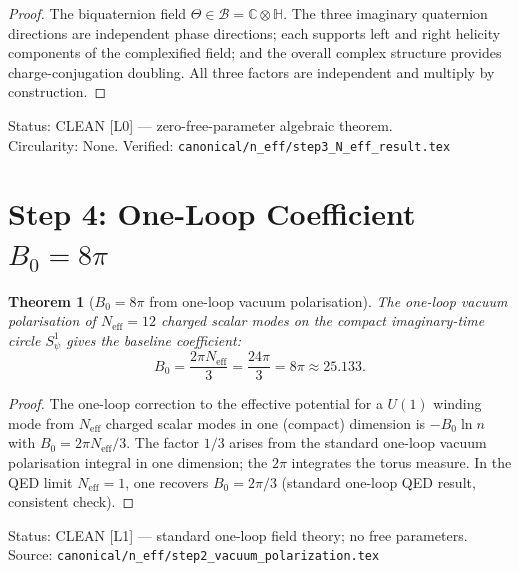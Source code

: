 \documentclass[12pt,a4paper]{article}
\newtheorem{theorem}{Theorem}[section]
\theoremstyle{definition}
\theoremstyle{remark}
\begin{document}
\begin{proof}
The biquaternion field $\Theta \in \mathcal{B} = \mathbb{C}\otimes\mathbb{H}$.
The three imaginary quaternion directions are independent phase directions;
each supports left and right helicity components of the complexified field;
and the overall complex structure provides charge-conjugation doubling.
All three factors are independent and multiply by construction.
\end{proof}

\begin{resultbox}
Status: CLEAN [L0] — zero-free-parameter algebraic theorem.\\
Circularity: None.  Verified: \texttt{canonical/n\_eff/step3\_N\_eff\_result.tex}
\end{resultbox}

\section{Step 4: One-Loop Coefficient $B_0 = 8\pi$}
\label{sec:ar:B0}

\begin{theorem}[$B_0 = 8\pi$ from one-loop vacuum polarisation]
\label{thm:ar:B0}
The one-loop vacuum polarisation of $N_{\mathrm{eff}} = 12$ charged scalar modes
on the compact imaginary-time circle $S^1_\psi$ gives the baseline coefficient:
\begin{equation}
  B_0 = \frac{2\pi N_{\mathrm{eff}}}{3}
      = \frac{24\pi}{3}
      = 8\pi
      \approx 25.133.
  \label{eq:ar:B0}
\end{equation}
\end{theorem}

\begin{proof}
The one-loop correction to the effective potential for a $U(1)$ winding mode
from $N_{\mathrm{eff}}$ charged scalar modes in one (compact) dimension is
$-B_0 \ln n$ with $B_0 = 2\pi N_{\mathrm{eff}}/3$.  The factor $1/3$ arises
from the standard one-loop vacuum polarisation integral in one dimension;
the $2\pi$ integrates the torus measure.  In the QED limit $N_{\mathrm{eff}}=1$,
one recovers $B_0 = 2\pi/3$ (standard one-loop QED result, consistent check).
\end{proof}

\begin{resultbox}
Status: CLEAN [L1] — standard one-loop field theory; no free parameters.\\
Source: \texttt{canonical/n\_eff/step2\_vacuum\_polarization.tex}
\end{resultbox}
\end{document}
